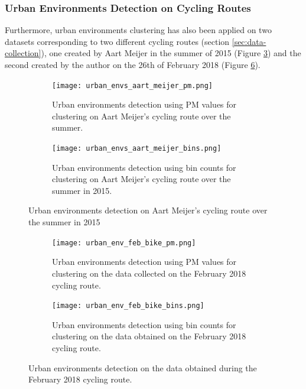 \documentclass[bsc,frontabs,twoside,singlespacing, parskip,deptreport]{infthesis}     %
\begin{document}
\subsubsection*{Urban Environments Detection on Cycling Routes}

Furthermore, urban environments clustering has also been applied on two datasets corresponding to two different cycling routes (section \ref{sec:data-collection}), one created by Aart Meijer in the summer of 2015 (Figure \ref{fig:meijer-bike-urban-envs}) and the second created by the author on the 26th of February 2018 (Figure \ref{fig:feb-bike-urban-envs}).

\begin{figure}[h!]
  \begin{subfigure}[t]{0.5\textwidth}
    \texttt{[image: urban\_envs\_aart\_meijer\_pm.png]}
    \caption{Urban environments detection using PM values for clustering on Aart Meijer's cycling route over the summer.}
    \label{fig:meijer-bike-urban-envs-pm}
  \end{subfigure}
  \hfill
  \begin{subfigure}[t]{0.5\textwidth}
    \texttt{[image: urban\_envs\_aart\_meijer\_bins.png]}
    \caption{Urban environments detection using bin counts for clustering on Aart Meijer's cycling route over the summer in 2015.}
    \label{fig:meijer-bike-urban-envs-bins}
  \end{subfigure}
  \caption{Urban environments detection on Aart Meijer's cycling route over the summer in 2015}
  \label{fig:meijer-bike-urban-envs}
\end{figure}

\begin{figure}[h!]
  \begin{subfigure}[t]{\textwidth}
    \texttt{[image: urban\_env\_feb\_bike\_pm.png]}
    \caption{Urban environments detection using PM values for clustering on the data collected on the February 2018 cycling route.}
    \label{fig:feb-bike-urban-envs-pm}
  \end{subfigure}
  \hfill
  \begin{subfigure}[t]{\textwidth}
    \texttt{[image: urban\_env\_feb\_bike\_bins.png]}
    \caption{Urban environments detection using bin counts for clustering on the data obtained on the February 2018 cycling route.}
    \label{fig:feb-bike-urban-envs-bins}
  \end{subfigure}
  \caption{Urban environments detection on the data obtained during the February 2018 cycling route.}
  \label{fig:feb-bike-urban-envs}
\end{figure}
\end{document}
